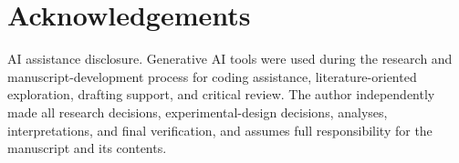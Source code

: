 \documentclass[11pt]{article}
\begin{document}
\section*{Acknowledgements}

AI assistance disclosure. Generative AI tools were used during the research
and manuscript-development process for coding assistance, literature-oriented
exploration, drafting support, and critical review. The author independently
made all research decisions, experimental-design decisions, analyses,
interpretations, and final verification, and assumes full responsibility for
the manuscript and its contents.



\end{document}
